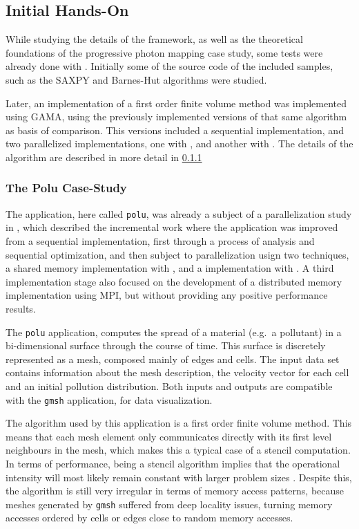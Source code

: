 \documentclass[main.tex]{subfiles}
\begin{document}
\subsection{Initial \gama Hands-On}

While studying the details of the framework, as well as the theoretical foundations of the progressive photon mapping case study, some tests were already done with \gama. Initially some of the source code of the included samples, such as the SAXPY and Barnes-Hut algorithms were studied.

Later, an implementation of a first order finite volume method was implemented using GAMA, using the previously implemented versions of that same algorithm as basis of comparison. This versions included a sequential implementation, and two parallelized implementations, one with \openmp, and another with \cuda. The details of the algorithm are described in more detail in \cref{sec:polu}

\subsubsection{The Polu Case-Study} \label{sec:polu}

The application, here called \texttt{polu}, was already a subject of a parallelization study in \cite{naps2012}, which described the incremental work where the application was improved from a sequential implementation, first through a process of analysis and sequential optimization, and then subject to parallelization usign two techniques, a shared memory \cpu implementation with \openmp, and a \gpu implementation with \cuda. A third implementation stage also focused on the development of a distributed memory implementation using \acs{MPI}, but without providing any positive performance results.

The \texttt{polu} application, computes the spread of a material (e.g.\ a pollutant) in a bi-dimensional surface through the course of time. This surface is discretely represented as a mesh, composed mainly of edges and cells. The input data set contains information about the mesh description, the velocity vector for each cell and an initial pollution distribution.
Both inputs and outputs are compatible with the \texttt{gmsh} application, for data visualization.


The algorithm used by this application is a first order finite volume method. This means that each mesh element only communicates directly with its first level neighbours in the mesh, which makes this a typical case of a stencil computation. In terms of performance, being a stencil algorithm implies that the operational intensity will most likely remain constant with larger problem sizes \cite{williams2009roofline,williams2010roofline}. Despite this, the algorithm is still very irregular in terms of memory access patterns, because meshes generated by \texttt{gmsh} suffered from deep locality issues, turning memory accesses ordered by cells or edges close to random memory accesses.
\end{document}
